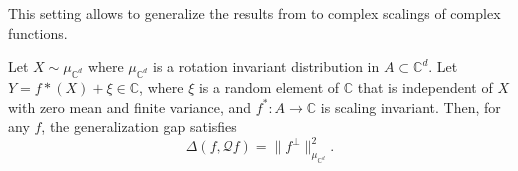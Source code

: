 \documentclass[twoside,11pt]{article}
\begin{document}
This setting allows to generalize the results from \citet{elesedy2021provably} to complex scalings of complex functions.
\begin{proposition}
Let $X\sim \mu_{\mathbb C^d}$ where $\mu_{\mathbb C^d}$ is a rotation invariant distribution in $A \subset \mathbb C^d$. Let $Y=f*(X) + \xi \in \mathbb C$, where $\xi$ is a random element of $\mathbb C$ that is independent of $X$ with zero mean and finite variance, and $f^*: A \to \mathbb C$ is scaling invariant. Then, for any $f$, the generalization gap satisfies
\begin{equation}
\Delta(f, \mathcal Q f) = \|f^\perp \|_{\mu_{\mathbb C^d}}^2.
\end{equation}
\end{proposition}

\end{document}
